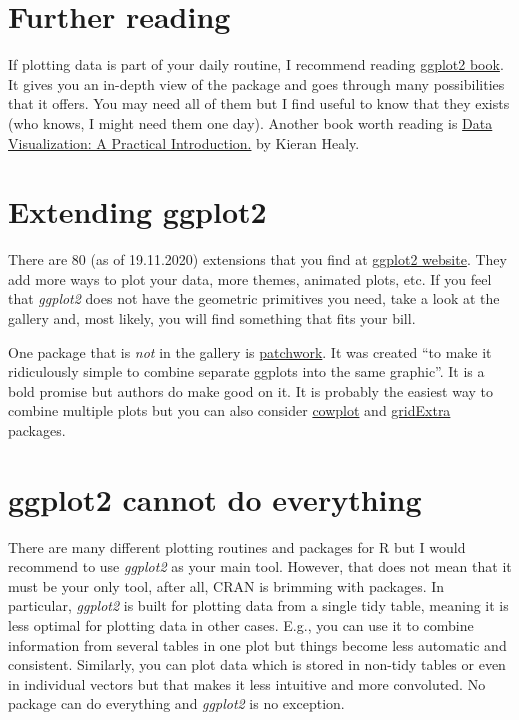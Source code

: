 \documentclass[
]{book}
\begin{document}
\hypertarget{further-reading}{%
\section{Further reading}\label{further-reading}}

If plotting data is part of your daily routine, I recommend reading \href{https://ggplot2-book.org/}{ggplot2 book}. It gives you an in-depth view of the package and goes through many possibilities that it offers. You may need all of them but I find useful to know that they exists (who knows, I might need them one day). Another book worth reading is \href{https://kieranhealy.org/publications/dataviz/}{Data Visualization: A Practical Introduction.} by Kieran Healy.

\hypertarget{extending-ggplot2}{%
\section{Extending ggplot2}\label{extending-ggplot2}}

There are 80 (as of 19.11.2020) extensions that you find at \href{https://exts.ggplot2.tidyverse.org/gallery/}{ggplot2 website}. They add more ways to plot your data, more themes, animated plots, etc. If you feel that \emph{ggplot2} does not have the geometric primitives you need, take a look at the gallery and, most likely, you will find something that fits your bill.

One package that is \emph{not} in the gallery is \href{https://patchwork.data-imaginist.com/}{patchwork}. It was created ``to make it ridiculously simple to combine separate ggplots into the same graphic''. It is a bold promise but authors do make good on it. It is probably the easiest way to combine multiple plots but you can also consider \href{https://github.com/wilkelab/cowplot}{cowplot} and \href{https://cran.r-project.org/web/packages/gridExtra/index.html}{gridExtra} packages.

\hypertarget{ggplot2-cannot-do-everything}{%
\section{ggplot2 cannot do everything}\label{ggplot2-cannot-do-everything}}

There are many different plotting routines and packages for R but I would recommend to use \emph{ggplot2} as your main tool. However, that does not mean that it must be your only tool, after all, CRAN is brimming with packages. In particular, \emph{ggplot2} is built for plotting data from a single tidy table, meaning it is less optimal for plotting data in other cases. E.g., you can use it to combine information from several tables in one plot but things become less automatic and consistent. Similarly, you can plot data which is stored in non-tidy tables or even in individual vectors but that makes it less intuitive and more convoluted. No package can do everything and \emph{ggplot2} is no exception.
\end{document}
